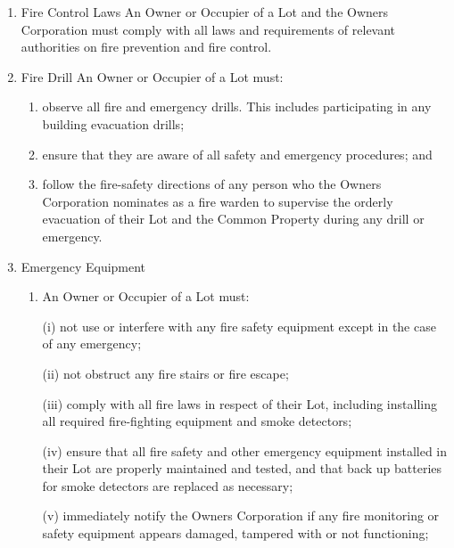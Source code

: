 \documentclass{article}
\begin{document}
\begin{enumerate}[label=\arabic*.]
\begin{enumerate}[label=\arabic{enumi}.\arabic*.]
\begin{enumerate}[label=(\arabic*)]
\begin{enumerate}[label=(\alph*)]
\end{enumerate}

\item  Fire Control Laws
\newline An Owner or Occupier of a Lot and the Owners Corporation must comply with all laws and requirements of relevant authorities on fire prevention and fire control.

\item  Fire Drill
\newline An Owner or Occupier of a Lot must:

\begin{enumerate}[label=(\alph*)]

\item  observe all fire and emergency drills. This includes participating in any building evacuation drills;

\item  ensure that they are aware of all safety and emergency procedures; and

\item  follow the fire-safety directions of any person who the Owners Corporation nominates as a fire warden to supervise the orderly evacuation of their Lot and the Common Property during any drill or emergency.

\end{enumerate}

\item  Emergency Equipment

\begin{enumerate}[label=(\alph*)]

\item  An Owner or Occupier of a Lot must:

(i) not use or interfere with any fire safety equipment except in the case of any emergency;

(ii) not obstruct any fire stairs or fire escape;

(iii) comply with all fire laws in respect of their Lot, including installing all required fire-fighting equipment and smoke detectors;
\newpage



(iv) ensure that all fire safety and other emergency equipment installed in their Lot are properly maintained and tested, and that back up batteries for smoke detectors are replaced as necessary;

(v) immediately notify the Owners Corporation if any fire monitoring or safety equipment appears damaged, tampered with or not functioning;


\end{enumerate}
\end{enumerate}
\end{enumerate}
\end{enumerate}
\end{document}
